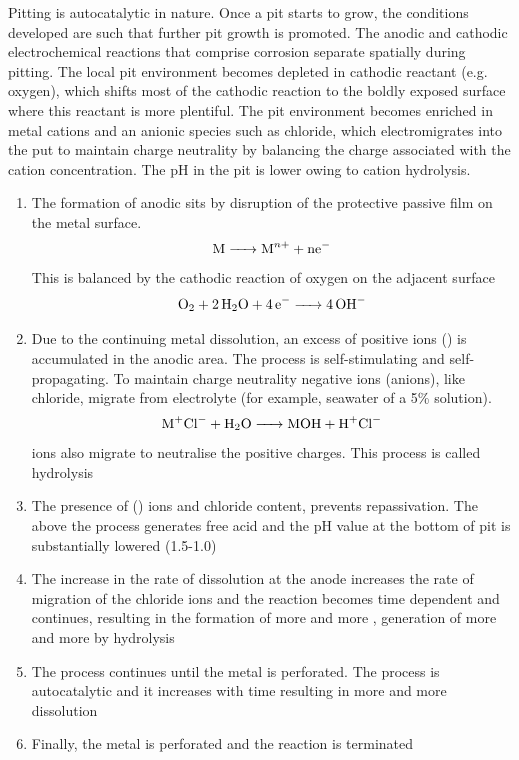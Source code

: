 Pitting is autocatalytic in nature. Once a pit starts to grow, the conditions developed are such that further pit growth is promoted. The anodic and cathodic electrochemical reactions that comprise corrosion separate spatially during pitting. The local pit environment becomes depleted in cathodic reactant (e.g. oxygen), which shifts most of the cathodic reaction to the boldly exposed surface where this reactant is more plentiful. The pit environment becomes enriched in metal cations and an anionic species such as chloride, which electromigrates into the put to maintain charge neutrality by balancing the charge associated with the cation concentration. The pH in the pit is lower owing to cation hydrolysis.
\begin{enumerate}
    \item The formation of anodic sits by disruption of the protective passive film on the metal surface.
          \begin{equation}
              \ce{M -> M^n+ + ne^-}
          \end{equation}
          This is balanced by the cathodic reaction of oxygen on the adjacent surface
          \begin{equation}
              \ce{O2 + 2H2O + 4e^- -> 4OH^-}
          \end{equation}
    \item Due to the continuing metal dissolution, an excess of positive ions () is accumulated in the anodic area. The process is self-stimulating and self-propagating. To maintain charge neutrality negative ions (anions), like chloride, migrate from electrolyte (for example, seawater of a 5\%  solution).
          \begin{equation}
              \ce{M^+Cl^- + H2O -> MOH + H^+Cl^-}
          \end{equation}
           ions also migrate to neutralise the positive charges. This process is called hydrolysis
    \item The presence of () ions and chloride content, prevents repassivation. The above the process generates free acid and the pH value at the bottom of pit is substantially lowered (1.5-1.0)
    \item The increase in the rate of dissolution at the anode increases the rate of migration of the chloride ions and the reaction becomes time dependent and continues, resulting in the formation of more and more , generation of more and more  by hydrolysis
    \item The process continues until the metal is perforated. The process is autocatalytic and it increases with time resulting in more and more dissolution
    \item Finally, the metal is perforated and the reaction is terminated
\end{enumerate}

